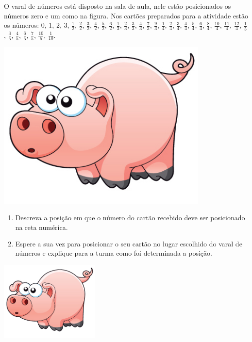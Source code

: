 \documentclass[a4,12pt]{book}
\newcounter{atividade}
\begin{document}
O varal de números está disposto na sala de aula, nele estão posicionados os números zero e um como na figura. Nos cartões preparados para a atividade estão os números: \mbox{} \newline
$0$, $1$, $2$, $3$, $\frac{1}{2}$, $\frac{2}{2}$, $\frac{3}{2}$, $\frac{4}{2}$, $\frac{5}{2}$, $\frac{6}{2}$,
$\frac{1}{3}$, $\frac{2}{3}$, $\frac{3}{3}$, $\frac{4}{3}$, $\frac{7}{3}$, $\frac{9}{3}$,
$\frac{1}{4}$, $\frac{2}{4}$, $\frac{3}{4}$, $\frac{4}{4}$, $\frac{5}{4}$, $\frac{6}{4}$, $\frac{8}{4}$, $\frac{10}{4}$, $\frac{11}{4}$, $\frac{12}{4}$,
$\frac{1}{5}$, $\frac{3}{5}$, $\frac{4}{5}$, $\frac{6}{5}$, $\frac{7}{5}$, $\frac{10}{5}$,
$\frac{1}{10}$.

\begin{imagem*}[breakable]{}{}
    \includegraphics[width=300pt, keepaspectratio]{pig}
\end{imagem*}
\begin{enumerate} [\quad a)] %
  \item     Descreva a posição em que o número do cartão recebido deve ser posicionado na reta numérica.
  \item     Espere a sua vez para posicionar o seu cartão no lugar escolhido do varal de números e explique para a turma como foi determinada a posição.
\end{enumerate} %






\includegraphics[width=\textwidth,height=4cm, keepaspectratio]{pig}
\end{document}
